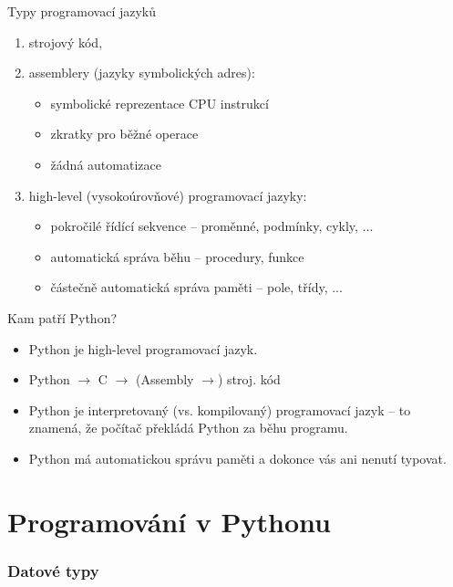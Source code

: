 \documentclass[aspectratio=169,11pt]{beamer}
\begin{document}
\begin{frame}{Typy programovací jazyků}
 \begin{enumerate}[label=(\arabic*)]
  \item<1-> strojový kód,
  \item<2-> assemblery (jazyky symbolických adres):
   \begin{itemize}
    \item symbolické reprezentace CPU instrukcí
    \item zkratky pro běžné operace
    \item žádná automatizace
   \end{itemize}
  \item<3-> high-level (vysokoúrovňové) programovací jazyky:
   \begin{itemize}
    \item pokročilé řídící sekvence -- proměnné, podmínky, cykly, ...
    \item automatická správa běhu -- procedury, funkce
    \item částečně automatická správa paměti -- pole, třídy, ...
   \end{itemize}
 \end{enumerate}
\end{frame}

\begin{frame}{Kam patří Python?}
 \begin{itemize}
  \item<1-> Python je high-level programovací jazyk.
  \item<2-> Python $\rightarrow$ C $\rightarrow$ (Assembly $\rightarrow$) stroj.
   kód 
  \item<3-> Python je \alert{interpretovaný} (vs. kompilovaný) programovací
   jazyk -- to znamená, že počítač překládá Python za běhu programu.
  \item<4-> Python má automatickou správu paměti a dokonce vás ani nenutí
   typovat.
 \end{itemize}
\end{frame}

\part[Programování v Pythonu]{Programování v Pythonu}

\begin{frame}[plain]
 \partpage
\end{frame}

\section[Datové typy]{Datové typy}
\end{document}
